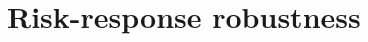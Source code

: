 \documentclass[sigconf,anonymous]{aamas}
\begin{document}

\section{Risk-response robustness}
\end{document}
